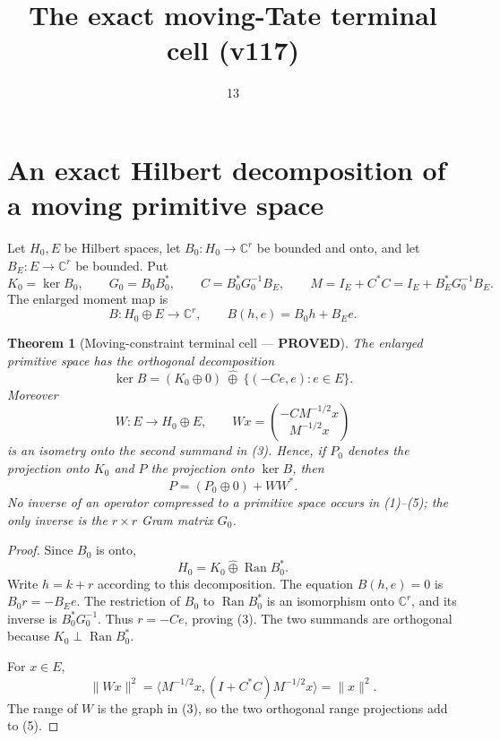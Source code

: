 \documentclass[11pt]{article}
\title{The exact moving-Tate terminal cell (v117)}
\date{13}
\newcommand{\PROVED}{\textcolor{green!40!black}{\textbf{PROVED}}}
\newtheorem{theorem}{Theorem}
\begin{document}
\maketitle

\section{An exact Hilbert decomposition of a moving primitive space}

Let $H_0,E$ be Hilbert spaces, let $B_0:H_0\to\mathbb C^r$ be bounded
and onto, and let $B_E:E\to\mathbb C^r$ be bounded.  Put
\begin{equation}
 K_0=\ker B_0,
 \qquad G_0=B_0B_0^*,
 \qquad C=B_0^*G_0^{-1}B_E,
 \qquad M=I_E+C^*C=I_E+B_E^*G_0^{-1}B_E.                  \tag{1}
\end{equation}
The enlarged moment map is
\begin{equation}
 B:H_0\oplus E\longrightarrow\mathbb C^r,
 \qquad B(h,e)=B_0h+B_Ee.                                  \tag{2}
\end{equation}

\begin{theorem}[Moving-constraint terminal cell --- \PROVED]
The enlarged primitive space has the orthogonal decomposition
\begin{equation}
 \ker B=(K_0\oplus0)\ \widehat\oplus\
          \{(-Ce,e):e\in E\}.                              \tag{3}
\end{equation}
Moreover
\begin{equation}
 W:E\longrightarrow H_0\oplus E,
 \qquad Wx=\binom{-CM^{-1/2}x}{M^{-1/2}x}                  \tag{4}
\end{equation}
is an isometry onto the second summand in (3).  Hence, if $P_0$ denotes
the projection onto $K_0$ and $P$ the projection onto $\ker B$, then
\begin{equation}
                         P=(P_0\oplus0)+WW^*.                \tag{5}
\end{equation}
No inverse of an operator compressed to a primitive space occurs in
(1)--(5); the only inverse is the $r\times r$ Gram matrix $G_0$.
\end{theorem}

\begin{proof}
Since $B_0$ is onto,
\[
 H_0=K_0\widehat\oplus\operatorname{Ran}B_0^*.
\]
Write $h=k+r$ according to this decomposition.  The equation $B(h,e)=0$
is $B_0r=-B_Ee$.  The restriction of $B_0$ to
$\operatorname{Ran}B_0^*$ is an isomorphism onto $\mathbb C^r$, and its
inverse is $B_0^*G_0^{-1}$.  Thus $r=-Ce$, proving (3).  The two summands
are orthogonal because $K_0\perp\operatorname{Ran}B_0^*$.

For $x\in E$,
\[
 \|Wx\|^2
 =\langle M^{-1/2}x,(I+C^*C)M^{-1/2}x\rangle
 =\|x\|^2.
\]
The range of $W$ is the graph in (3), so the two orthogonal range
projections add to (5).
\end{proof}
\end{document}
